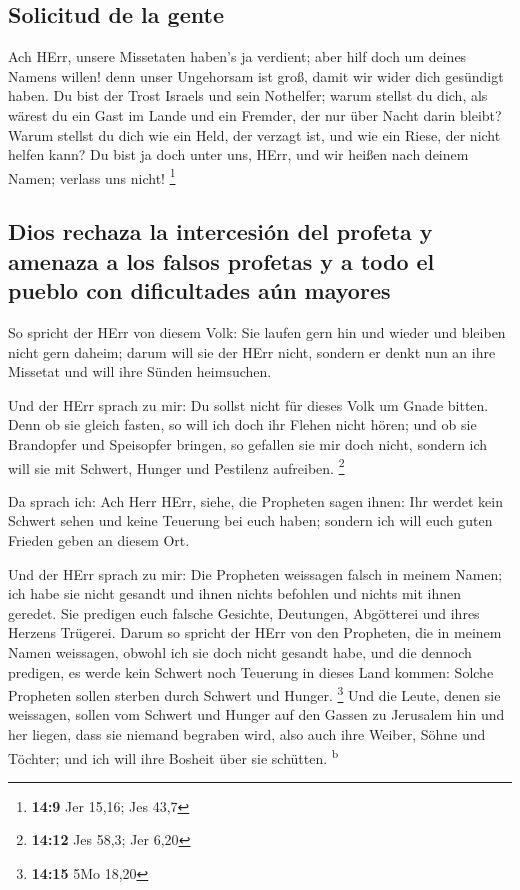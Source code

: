 \hypertarget{solicitud-de-la-gente}{%
\subsection{Solicitud de la gente}\label{solicitud-de-la-gente}}

 Ach HErr, unsere Missetaten haben's ja verdient; aber
hilf doch um deines Namens willen! denn unser Ungehorsam ist groß, damit
wir wider dich gesündigt haben.  Du bist der Trost Israels
und sein Nothelfer; warum stellst du dich, als wärest du ein Gast im
Lande und ein Fremder, der nur über Nacht darin bleibt? 
Warum stellst du dich wie ein Held, der verzagt ist, und wie ein Riese,
der nicht helfen kann? Du bist ja doch unter uns, HErr, und wir heißen
nach deinem Namen; verlass uns nicht! \footnote{\textbf{14:9} Jer 15,16;
  Jes 43,7}

\hypertarget{dios-rechaza-la-intercesiuxf3n-del-profeta-y-amenaza-a-los-falsos-profetas-y-a-todo-el-pueblo-con-dificultades-auxfan-mayores}{%
\subsection{Dios rechaza la intercesión del profeta y amenaza a los
falsos profetas y a todo el pueblo con dificultades aún
mayores}\label{dios-rechaza-la-intercesiuxf3n-del-profeta-y-amenaza-a-los-falsos-profetas-y-a-todo-el-pueblo-con-dificultades-auxfan-mayores}}

 So spricht der HErr von diesem Volk: Sie laufen gern hin
und wieder und bleiben nicht gern daheim; darum will sie der HErr nicht,
sondern er denkt nun an ihre Missetat und will ihre Sünden heimsuchen.

 Und der HErr sprach zu mir: Du sollst nicht für dieses
Volk um Gnade bitten.  Denn ob sie gleich fasten, so will
ich doch ihr Flehen nicht hören; und ob sie Brandopfer und Speisopfer
bringen, so gefallen sie mir doch nicht, sondern ich will sie mit
Schwert, Hunger und Pestilenz aufreiben. \footnote{\textbf{14:12} Jes
  58,3; Jer 6,20}

 Da sprach ich: Ach Herr HErr, siehe, die Propheten sagen
ihnen: Ihr werdet kein Schwert sehen und keine Teuerung bei euch haben;
sondern ich will euch guten Frieden geben an diesem Ort.

 Und der HErr sprach zu mir: Die Propheten weissagen
falsch in meinem Namen; ich habe sie nicht gesandt und ihnen nichts
befohlen und nichts mit ihnen geredet. Sie predigen euch falsche
Gesichte, Deutungen, Abgötterei und ihres Herzens Trügerei.
 Darum so spricht der HErr von den Propheten, die in
meinem Namen weissagen, obwohl ich sie doch nicht gesandt habe, und die
dennoch predigen, es werde kein Schwert noch Teuerung in dieses Land
kommen: Solche Propheten sollen sterben durch Schwert und Hunger.
\footnote{\textbf{14:15} 5Mo 18,20}  Und die Leute, denen
sie weissagen, sollen vom Schwert und Hunger auf den Gassen zu Jerusalem
hin und her liegen, dass sie niemand begraben wird, also auch ihre
Weiber, Söhne und Töchter; und ich will ihre Bosheit über sie schütten.
\textsuperscript{b}

